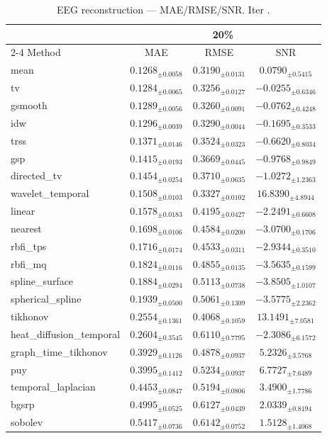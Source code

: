 ﻿%
\begin{table}[ht]
\centering
\caption[EEG reconstruction - Iteration it32]{EEG reconstruction — MAE/RMSE/SNR. Iter .}
\label{tab:main_it32_3syn_mr20_only}
\small
\begin{tabular}{lccc}
\toprule
\multicolumn{1}{c}{} & \multicolumn{3}{c}{20\%} \\
\cmidrule(lr){2-4}
Method & MAE & RMSE & SNR \\
\midrule
mean & $0.1268_{\pm 0.0058}$ & $0.3190_{\pm 0.0131}$ & $0.0790_{\pm 0.5415}$ \\
tv & $0.1284_{\pm 0.0065}$ & $0.3256_{\pm 0.0127}$ & $-0.0255_{\pm 0.6346}$ \\
gsmooth & $0.1289_{\pm 0.0056}$ & $0.3260_{\pm 0.0091}$ & $-0.0762_{\pm 0.4248}$ \\
idw & $0.1296_{\pm 0.0039}$ & $0.3290_{\pm 0.0044}$ & $-0.1695_{\pm 0.3533}$ \\
trss & $0.1371_{\pm 0.0146}$ & $0.3524_{\pm 0.0323}$ & $-0.6620_{\pm 0.8034}$ \\
gsp & $0.1415_{\pm 0.0193}$ & $0.3669_{\pm 0.0445}$ & $-0.9768_{\pm 0.9849}$ \\
directed\_tv & $0.1454_{\pm 0.0254}$ & $0.3710_{\pm 0.0635}$ & $-1.0272_{\pm 1.2363}$ \\
wavelet\_temporal & $0.1508_{\pm 0.0103}$ & $0.3327_{\pm 0.0102}$ & $16.8390_{\pm 4.8944}$ \\
linear & $0.1578_{\pm 0.0183}$ & $0.4195_{\pm 0.0427}$ & $-2.2491_{\pm 0.6608}$ \\
nearest & $0.1698_{\pm 0.0106}$ & $0.4584_{\pm 0.0200}$ & $-3.0700_{\pm 0.1706}$ \\
rbfi\_tps & $0.1716_{\pm 0.0174}$ & $0.4533_{\pm 0.0311}$ & $-2.9344_{\pm 0.3510}$ \\
rbfi\_mq & $0.1824_{\pm 0.0116}$ & $0.4855_{\pm 0.0135}$ & $-3.5635_{\pm 0.1599}$ \\
spline\_surface & $0.1884_{\pm 0.0294}$ & $0.5113_{\pm 0.0738}$ & $-3.8505_{\pm 1.0107}$ \\
spherical\_spline & $0.1939_{\pm 0.0500}$ & $0.5061_{\pm 0.1309}$ & $-3.5775_{\pm 2.2362}$ \\
tikhonov & $0.2554_{\pm 0.1361}$ & $0.4068_{\pm 0.1059}$ & $13.1491_{\pm 7.0581}$ \\
heat\_diffusion\_temporal & $0.2604_{\pm 0.3545}$ & $0.6110_{\pm 0.7795}$ & $-2.3086_{\pm 6.1572}$ \\
graph\_time\_tikhonov & $0.3929_{\pm 0.1126}$ & $0.4878_{\pm 0.0937}$ & $5.2326_{\pm 3.5768}$ \\
puy & $0.3995_{\pm 0.1412}$ & $0.5234_{\pm 0.0937}$ & $6.7727_{\pm 7.6489}$ \\
temporal\_laplacian & $0.4453_{\pm 0.0847}$ & $0.5194_{\pm 0.0806}$ & $3.4900_{\pm 1.7786}$ \\
bgsrp & $0.4995_{\pm 0.0525}$ & $0.6127_{\pm 0.0439}$ & $2.0339_{\pm 0.8194}$ \\
sobolev & $0.5417_{\pm 0.0736}$ & $0.6142_{\pm 0.0752}$ & $1.5128_{\pm 1.4068}$ \\
\bottomrule
\end{tabular}
\end{table}








